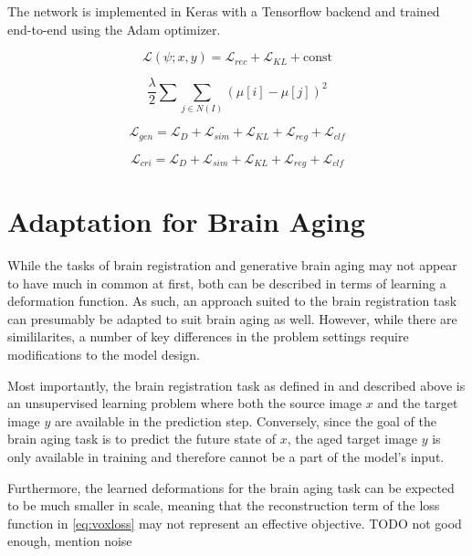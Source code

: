 The network is implemented in Keras with a Tensorflow backend and trained end-to-end using the Adam \cite{Adam} optimizer.


\begin{equation}
	\mathcal{L}(\psi; x, y) = \mathcal{L}_{rec} + \mathcal{L}_{KL} + \text{const} 
\end{equation}

\begin{equation}
	\frac{\lambda}{2} \sum \sum_{j \in N(I)} ( \mu[i] - \mu[j])^{2}
\end{equation}



\begin{equation}
	\mathcal{L}_{gen} = \mathcal{L}_{D} + \mathcal{L}_{sim} + \mathcal{L}_{KL} + \mathcal{L}_{reg} + \mathcal{L}_{clf} 
\end{equation}

\begin{equation}
	\mathcal{L}_{cri} = \mathcal{L}_{D} + \mathcal{L}_{sim} + \mathcal{L}_{KL} + \mathcal{L}_{reg} + \mathcal{L}_{clf} 
\end{equation}



\section{Adaptation for Brain Aging}
While the tasks of brain registration and generative brain aging may not appear to have much in common at first, both can be described in terms of learning a deformation function. As such, an approach suited to the brain registration task can presumably be adapted to suit brain aging as well. However, while there are simililarites, a number of key differences in the problem settings require modifications to the model design.

Most importantly, the brain registration task as defined in \cite{voxelmorph} and described above is an unsupervised learning problem where both the source image $x$ and the target image $y$ are available in the prediction step. Conversely, since the goal of the brain aging task is to predict the future state of $x$, the aged target image $y$ is only available in training and therefore cannot be a part of the model's input.

Furthermore, the learned deformations for the brain aging task can be expected to be much smaller in scale, meaning that the reconstruction term of the loss function in \autoref{eq:voxloss} may not represent an effective objective. TODO not good enough, mention noise

